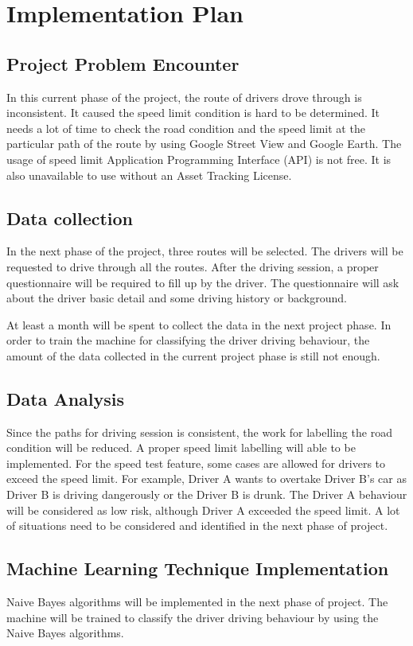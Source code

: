 \chapter{Implementation Plan}
\section{Project Problem Encounter}
In this current phase of the project, the route of drivers drove through is inconsistent. It caused the speed limit condition is hard to be determined. It needs a lot of time to check the road condition and the speed limit at the particular path of the route by using Google Street View and Google Earth. The usage of speed limit Application Programming Interface (API) is not free. It is also unavailable to use without an Asset Tracking License.

\section{Data collection}
In the next phase of the project, three routes will be selected. The drivers will be requested to drive through all the routes. After the driving session, a proper questionnaire will be required to fill up by the driver. The questionnaire will ask about the driver basic detail and some driving history or background.

At least a month will be spent to collect the data in the next project phase. In order to train the machine for classifying the driver driving behaviour, the amount of the data collected in the current project phase is still not enough.

\section{Data Analysis}
Since the paths for driving session is consistent, the work for labelling the road condition will be reduced. A proper speed limit labelling will able to be implemented. For the speed test feature, some cases are allowed for drivers to exceed the speed limit. For example, Driver A wants to overtake Driver B's car as Driver B is driving dangerously or the Driver B is drunk. The Driver A behaviour will be considered as low risk, although Driver A exceeded the speed limit. A lot of situations need to be considered and identified in the next phase of project.

\section{Machine Learning Technique Implementation}
Naive Bayes algorithms will be implemented in the next phase of project. The machine will be trained to classify the driver driving behaviour by using the Naive Bayes algorithms. 

